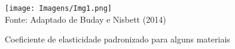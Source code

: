 \begin{figure}[!htb]
    \centering
    \caption{Coeficiente de elasticidade padronizado para alguns materiais}
    \texttt{[image: Imagens/Img1.png]}\\
    {\footnotesize Fonte: Adaptado de Buday e Nisbett (2014)}
    \label{fig:1}
\end{figure}